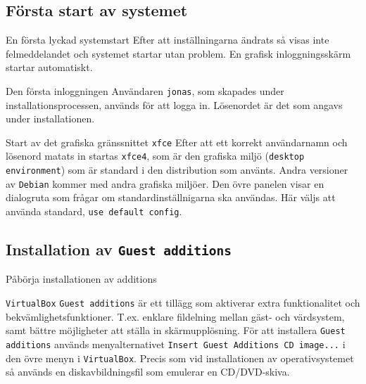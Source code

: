 {%
\subsection{Första start av systemet}

           {En första lyckad systemstart}
           {Efter att inställningarna ändrats så visas inte felmeddelandet och
            systemet startar utan problem. En grafisk inloggningsskärm startar
            automatiskt.}
           {}

           {Den första inloggningen}
           {Användaren \texttt{jonas}, som skapades under
            installationsprocessen, används för att logga in.  Lösenordet är
            det som angavs under installationen.}
           {}

           {Start av det grafiska gränssnittet \texttt{xfce}}
           {Efter att ett korrekt användarnamn och lösenord matats in startas
            \texttt{xfce4}, som är den grafiska miljö
            (\texttt{desktop environment}) som är standard i den distribution
            som använts. Andra versioner av \texttt{Debian} kommer med andra
            grafiska miljöer. Den övre panelen visar en dialogruta som frågar
            om standardinställnigarna ska användas. Här väljs att använda
            standard, \texttt{use default config}.}
           {}


\subsection{Installation av \texttt{Guest additions}}

           {Påbörja installationen av \Guest additions}}
           {\texttt{VirtualBox} \texttt{Guest additions} är ett tillägg som
            aktiverar extra funktionalitet och bekvämlighetsfunktioner. T.ex.
            enklare fildelning mellan gäst- och värdsystem, samt bättre
            möjligheter att ställa in skärmupplösning. För att installera
            \texttt{Guest additions} används menyalternativet
            \texttt{Insert Guest Additions CD image...} i den övre menyn i
            \texttt{VirtualBox}. Precis som vid installationen av operativsystemet
            så används en diskavbildningsfil som emulerar en CD/DVD-skiva.}
           {}

